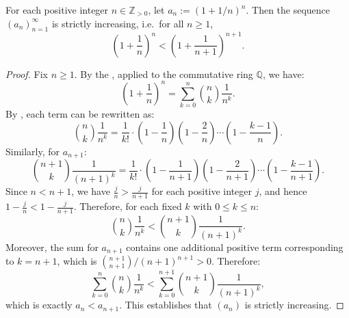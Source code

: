 \begin{lemma} \label{lemma:sequence_one_plus_one_over_n_to_the_n_is_strictly_increasing}
    For each positive integer $n \in \mathbb{Z}_{> 0}$, let $a_n := (1 + 1/n)^n$. Then the sequence $(a_n)_{n=1}^\infty$ is strictly increasing, i.e.\ for all $n \geq 1$,
    $$\left(1 + \frac{1}{n}\right)^n < \left(1 + \frac{1}{n+1}\right)^{n+1}.$$
\end{lemma}

\begin{proof}
    Fix $n \geq 1$. By the , applied to the commutative ring $\mathbb{Q}$, we have:
    $$\left(1 + \frac{1}{n}\right)^n = \sum_{k=0}^n \binom{n}{k} \frac{1}{n^k}.$$
    By , each term can be rewritten as:
    $$\binom{n}{k} \frac{1}{n^k} = \frac{1}{k!} \cdot \left(1 - \frac{1}{n}\right) \left(1 - \frac{2}{n}\right) \cdots \left(1 - \frac{k-1}{n}\right).$$
    Similarly, for $a_{n+1}$:
    $$\binom{n+1}{k} \frac{1}{(n+1)^k} = \frac{1}{k!} \cdot \left(1 - \frac{1}{n+1}\right) \left(1 - \frac{2}{n+1}\right) \cdots \left(1 - \frac{k-1}{n+1}\right).$$
    Since $n < n+1$, we have $\frac{j}{n} > \frac{j}{n+1}$ for each positive integer $j$, and hence $1 - \frac{j}{n} < 1 - \frac{j}{n+1}$. Therefore, for each fixed $k$ with $0 \leq k \leq n$:
    $$\binom{n}{k} \frac{1}{n^k} < \binom{n+1}{k} \frac{1}{(n+1)^k}.$$
    Moreover, the sum for $a_{n+1}$ contains one additional positive term corresponding to $k = n+1$, which is $\binom{n+1}{n+1}/(n+1)^{n+1} > 0$. Therefore:
    $$\sum_{k=0}^n \binom{n}{k} \frac{1}{n^k} < \sum_{k=0}^{n+1} \binom{n+1}{k} \frac{1}{(n+1)^k},$$
    which is exactly $a_n < a_{n+1}$. This establishes that $(a_n)$ is strictly increasing.
\end{proof}
